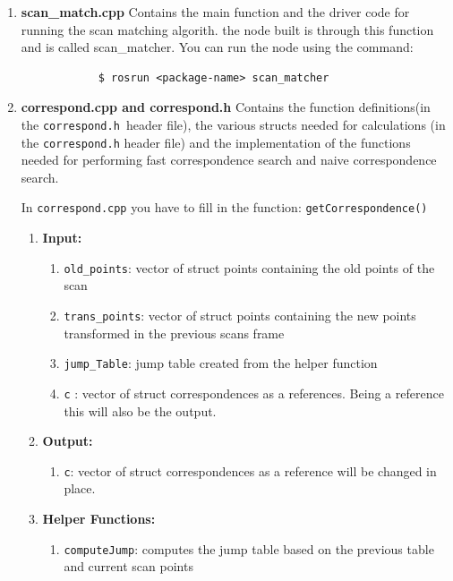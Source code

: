 \documentclass[letta4 paper]{article}
\numberwithin{equation}{section}
\newcommand{\0}{\mathbf{0}}
\begin{document}
	 \begin{enumerate}
	 		\item \textbf{scan\_match.cpp}
	 		Contains the main function and the driver code for running the scan matching algorith. the node built is through this function and is called scan\_matcher. You can run the node using the command: 
	 		\begin{verbatim}
	 		$ rosrun <package-name> scan_matcher
	 		\end{verbatim}
	 		
	 		\item \textbf{correspond.cpp and correspond.h} 
	 		Contains the function definitions(in the \texttt{correspond.h }header file), the various structs needed for calculations (in the \texttt{correspond.h} header file) and the implementation of the functions needed for performing fast correspondence search and naive correspondence search. 
	 	
	 		In \texttt{correspond.cpp} you have to fill in the function: \texttt{getCorrespondence()}
	 		\begin{enumerate}
		 		\item \textbf{Input:}
		 		\begin{enumerate}
		 			\item \texttt{old\_points}: vector of struct points containing the old points of the scan
		 			\item \texttt{trans\_points}: vector of struct points containing the new points transformed in the previous scans frame
		 			\item \texttt{jump\_Table}: jump table created from the helper function 
		 			\item \texttt{c} : vector of struct correspondences as a references. Being a reference this will also be the output. 
		 		\end{enumerate}
	 		
		 		\item \textbf{Output:}
		 		\begin{enumerate}
		 			\item \texttt{c}: vector of struct correspondences as a reference will be changed in place. 
		 		\end{enumerate}{}
		 		\item \textbf{Helper Functions:}
		 		\begin{enumerate}
		 			\item \texttt{computeJump}: computes the jump table based on the previous table and current scan points 
		 		\end{enumerate}
	 		\end{enumerate}
		 		

\end{enumerate}
\end{document}
